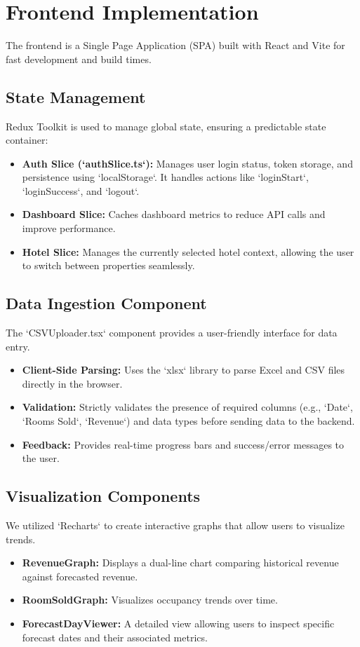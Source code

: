 \documentclass[letterpaper,11pt]{report}
\begin{document}
\section{Frontend Implementation}
The frontend is a Single Page Application (SPA) built with React and Vite for fast development and build times.

\subsection{State Management}
Redux Toolkit is used to manage global state, ensuring a predictable state container:
\begin{itemize}
    \item \textbf{Auth Slice (`authSlice.ts`):} Manages user login status, token storage, and persistence using `localStorage`. It handles actions like `loginStart`, `loginSuccess`, and `logout`.
    \item \textbf{Dashboard Slice:} Caches dashboard metrics to reduce API calls and improve performance.
    \item \textbf{Hotel Slice:} Manages the currently selected hotel context, allowing the user to switch between properties seamlessly.
\end{itemize}

\subsection{Data Ingestion Component}
The `CSVUploader.tsx` component provides a user-friendly interface for data entry.
\begin{itemize}
    \item \textbf{Client-Side Parsing:} Uses the `xlsx` library to parse Excel and CSV files directly in the browser.
    \item \textbf{Validation:} Strictly validates the presence of required columns (e.g., `Date`, `Rooms Sold`, `Revenue`) and data types before sending data to the backend.
    \item \textbf{Feedback:} Provides real-time progress bars and success/error messages to the user.
\end{itemize}

\subsection{Visualization Components}
We utilized `Recharts` to create interactive graphs that allow users to visualize trends.
\begin{itemize}
    \item \textbf{RevenueGraph:} Displays a dual-line chart comparing historical revenue against forecasted revenue.
    \item \textbf{RoomSoldGraph:} Visualizes occupancy trends over time.
    \item \textbf{ForecastDayViewer:} A detailed view allowing users to inspect specific forecast dates and their associated metrics.
\end{itemize}
\end{document}
